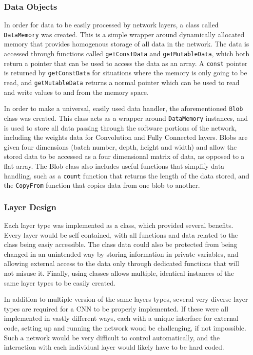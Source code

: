 \documentclass[12pt]{article}
\begin{document}
\subsubsection{Data Objects}
\label{sec:Imp-Network-Blobs}

In order for data to be easily processed by network layers, a class called \lstinline|DataMemory| was created. This is a simple wrapper around dynamically allocated memory that provides homogenous storage of all data in the network. The data is accessed through functions called \lstinline|getConstData| and \lstinline|getMutableData|, which both return a pointer that can be used to access the data as an array. A \lstinline|const| pointer is returned by \lstinline|getConstData| for situations where the memory is only going to be read, and \lstinline|getMutableData| returns a normal pointer which can be used to read and write values to and from the memory space.

In order to make a universal, easily used data handler, the aforementioned \lstinline|Blob| class was created. This class acts as a wrapper around \lstinline|DataMemory| instances, and is used to store all data passing through the software portions of the network, including the weights data for Convolution and Fully Connected layers. Blobs are given four dimensions (batch number, depth, height and width) and allow the stored data to be accessed as a four dimensional matrix of data, as opposed to a flat array. The Blob class also includes useful functions that simplify data handling, such as a \lstinline|count| function that returns the length of the data stored, and the \lstinline|CopyFrom| function that copies data from one blob to another.

\subsubsection{Layer Design}
\label{sec:Design-Network-Layers}

Each layer type was implemented as a class, which provided several benefits. Every layer would be self contained, with all functions and data related to the class being easiy accessible. The class data could also be protected from being changed in an unintended way by storing information in private variables, and allowing external access to the data only through dedicated functions that will not misuse it. Finally, using classes allows multiple, identical instances of the same layer types to be easily created.

In addition to multiple version of the same layers types, several very diverse layer types are required for a CNN to be properly implemented. If these were all implemented in vastly different ways, each with a unique interface for external code, setting up and running the network woud be challenging, if not impossible. Such a network would be very difficult to control automatically, and the interaction with each individual layer would likely have to be hard coded. 
\end{document}
